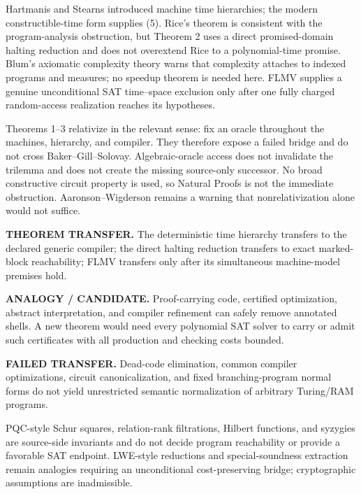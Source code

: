 \documentclass[11pt]{article}
\begin{document}
Hartmanis and Stearns introduced machine time hierarchies; the modern
constructible-time form supplies (5).  Rice's theorem is consistent with the
program-analysis obstruction, but Theorem 2 uses a direct promised-domain
halting reduction and does not overextend Rice to a polynomial-time promise.
Blum's axiomatic complexity theory warns that complexity attaches to indexed
programs and measures; no speedup theorem is needed here.  FLMV supplies a
genuine unconditional SAT time--space exclusion only after one fully charged
random-access realization reaches its hypotheses.

Theorems 1--3 relativize in the relevant sense: fix an oracle throughout the
machines, hierarchy, and compiler.  They therefore expose a failed bridge and
do not cross Baker--Gill--Solovay.  Algebraic-oracle access does not invalidate
the trilemma and does not create the missing source-only successor.  No broad
constructive circuit property is used, so Natural Proofs is not the immediate
obstruction.  Aaronson--Wigderson remains a warning that nonrelativization
alone would not suffice.

\begin{description}[leftmargin=0cm,labelwidth=0cm]
\item[] \textbf{THEOREM TRANSFER.}
The deterministic time hierarchy transfers to the declared generic compiler;
the direct halting reduction transfers to exact marked-block reachability;
FLMV transfers only after its simultaneous machine-model premises hold.
\item[] \textbf{ANALOGY / CANDIDATE.}
Proof-carrying code, certified optimization, abstract interpretation, and
compiler refinement can safely remove annotated shells.  A new theorem would
need every polynomial SAT solver to carry or admit such certificates with
all production and checking costs bounded.
\item[] \textbf{FAILED TRANSFER.}
Dead-code elimination, common compiler optimizations, circuit canonicalization,
and fixed branching-program normal forms do not yield unrestricted semantic
normalization of arbitrary Turing/RAM programs.
\end{description}

PQC-style Schur squares, relation-rank filtrations, Hilbert functions, and
syzygies are source-side invariants and do not decide program reachability or
provide a favorable SAT endpoint.  LWE-style reductions and special-soundness
extraction remain analogies requiring an unconditional cost-preserving bridge;
cryptographic assumptions are inadmissible.
\end{document}
